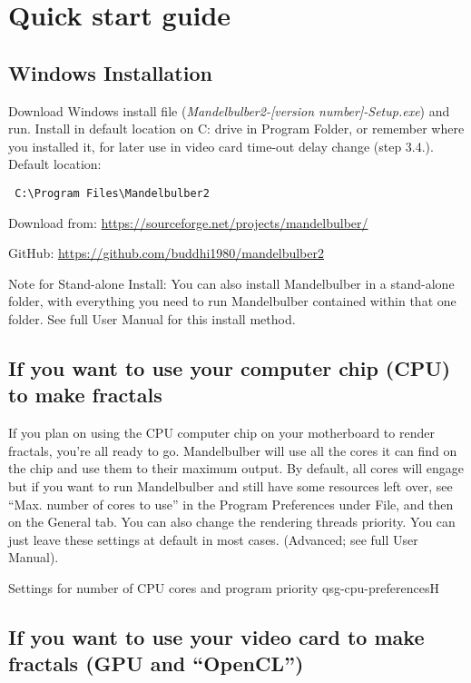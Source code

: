 \section{Quick start guide}\label{quck-start-guide}

\subsection{Windows Installation}\label{qsg-windows-instalation}
Download Windows install file (\emph{Mandelbulber2-[version number]-Setup.exe}) and run. Install in default location on C: drive in Program Folder, or remember where you installed it, for later use in video card time-out delay change (step 3.4.). Default location:
\begin{verbatim} 
 C:\Program Files\Mandelbulber2
\end{verbatim}

Download from:  \href{https://sourceforge.net/projects/mandelbulber/} {https://sourceforge.net/projects/mandelbulber/}

GitHub: \href{https://github.com/buddhi1980/mandelbulber2} { https://github.com/buddhi1980/mandelbulber2}

Note for Stand-alone Install:
You can also install Mandelbulber in a stand-alone folder, with everything you need to run Mandelbulber contained within that one folder. See full User Manual for this install method. 

\subsection{If you want to use your computer chip (CPU) to make fractals}\label{qsg-cpu}
If you plan on using the CPU computer chip on your motherboard to render fractals, you’re all ready to go. Mandelbulber will use all the cores it can find on the chip and use them to their maximum output. By default, all cores will engage but if you want to run Mandelbulber and still have some resources left over, see “Max. number of cores to use” in the Program Preferences under File, and then on the General tab.   You can also change the rendering threads priority. You can just leave these settings at default in most cases. (Advanced; see full User Manual).

{Settings for number of CPU cores and program priority}
{qsg-cpu-preferences}{H}

\subsection{If you want to use your video card to make fractals (GPU and “OpenCL”)}\label{qsg-opencl}

